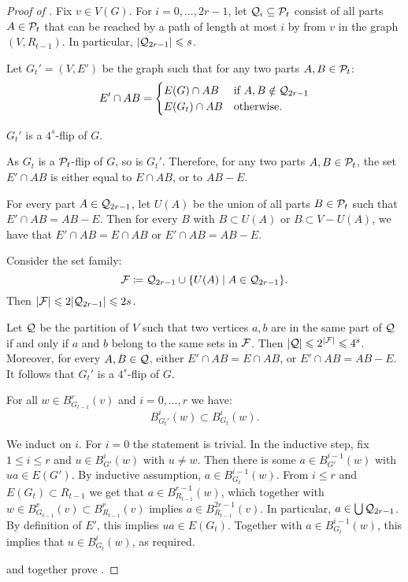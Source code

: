     \begin{proof}[Proof of ]
        Fix $v\in V(G)$. For $i=0,\ldots,2r-1$, let 
 $\cal Q_i\subset \cal P_t$ consist of all parts $A\in\cal P_t$ that can be reached by a path of length at most $i$ by from $v$ in the graph $(V,R_{t-1})$.
In particular, $|\cal Q_{2r-1}|\le s$.

Let $G_t'=(V,E')$ be the graph 
such that for any two parts $A,B\in\cal P_t$:
$$E'\cap AB=
\begin{cases}
    E(G)\cap AB&\text{if $A,B\notin\cal Q_{2r-1}$}\\
    E(G_t)\cap AB&\text{otherwise}.
\end{cases}$$

\begin{claim}\label{cl:k-flip}
    $G_t'$ is a $4^s$-flip of $G$.
\end{claim}
\begin{claimproof}
    As $G_t$ is a $\cal P_t$-flip of $G$, so is $G_t'$.
    Therefore, for any two parts $A,B\in\cal P_t$, 
    the set $E'\cap AB$ is either equal to $E\cap AB$,
    or to $AB-E$.

    For every part $A\in\cal Q_{2r-1}$, let $U(A)$ be the union of all parts 
    $B\in\cal P_t$ such that $E'\cap AB= AB-E$.
    Then for every $B$ with $B\subset U(A)$ or $B\subset V- U(A)$,
    we have that
    $E'\cap AB=E\cap AB$ or 
     $E'\cap AB=AB-E$.

    Consider the set family:
    $$\cal F\coloneqq \cal Q_{2r-1} \cup \setof{U(A)}{A\in \cal Q_{2r-1}}.$$ Then $|\cal F|\le 2|\cal Q_{2r-1}|\le 2s$.
    
    Let $\cal Q$ be the partition 
    of $V$ such that 
    two vertices $a,b$ are in the same part of $\cal Q$ if and only if $a$ and $b$ belong to the same sets in $\cal F$.
    Then $|\cal Q|\le 2^{|\cal F|}\le 4^{s}$.
    Moreover, for every $A,B\in \cal Q$,
    either $E'\cap AB=E\cap AB$,
    or $E'\cap AB=AB-E$.
    It follows that 
    $G_t'$ is a $4^s$-flip of $G$.
\end{claimproof}



\begin{claim}\label{cl:balls}
    For all $w\in B^r_{G_{t-1}}(v)$
 and $i=0,\ldots,r$ we have:
    $$B^i_{G_t'}(w)\subset B^i_{G_t}(w).$$
\end{claim}

\begin{claimproof}
    We induct on $i$. For $i=0$ the statement is trivial.
In the inductive step, fix $1\le i\le r$ and $u\in B^i_{G'}(w)$ with $u\neq w$.
Then there is some  $a\in B^{i-1}_{G'}(w)$ with $ua\in E(G')$.
By inductive assumption, $a\in B^{i-1}_{G_t}(w)$.
From  $i\le r$ and  $E(G_t)\subset R_{t-1}$
we get that $a\in B^{r-1}_{R_{t-1}}(w)$,
which together with $w\in B^{r}_{G_{t-1}}(v)\subset B^{r}_{R_{t-1}}(v)$ implies $a\in B^{2r-1}_{R_{t-1}}(v)$. In particular, $a\in \bigcup \cal Q_{2r-1}$.
By definition of $E'$, this implies $ua\in E(G_t)$. Together with 
$a\in B^{i-1}_{G_t}(w)$, this implies that $u\in B^{i}_{G_t}(w)$, as required.
\end{claimproof}
 and  together prove .
\end{proof}
